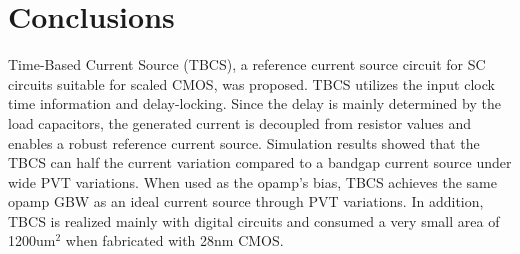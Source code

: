 \documentclass[paper]{ieice}
\begin{document}
\section{Conclusions}
\qquad Time-Based Current Source (TBCS), a reference current source circuit for SC circuits suitable for scaled CMOS, was proposed. TBCS utilizes the input clock time information and delay-locking. Since the delay is mainly determined by the load capacitors, the generated current is decoupled from resistor values and enables a robust reference current source.  Simulation results showed that the TBCS can half the current variation compared to a bandgap current source under wide PVT variations. When used as the opamp's bias, TBCS achieves the same opamp GBW as an ideal current source through PVT variations. In addition, TBCS is realized mainly with digital circuits and consumed a very small area of 1200um$^2$ when fabricated with 28nm CMOS.




\label{profile}
\end{document}
